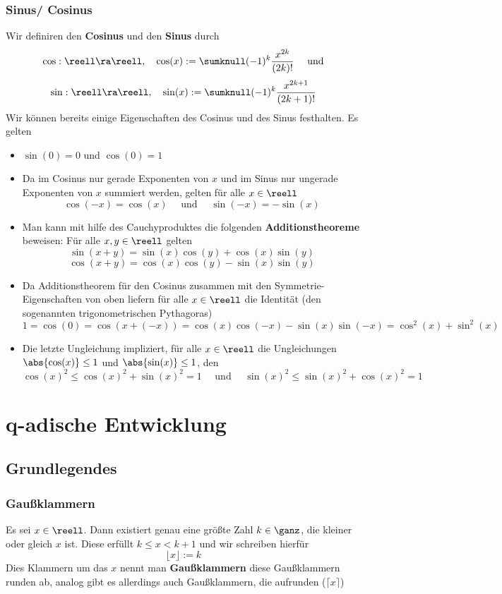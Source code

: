 \documentclass{kit}
\begin{document}
    \subsubsection{Sinus/ Cosinus}
      Wir definiren den \textbf{Cosinus} und den \textbf{Sinus} durch
      $$\cos:\reell\ra\reell,\quad\cos(x):=\sumknull(-1)^k\frac{x^{2k}}{(2k)!}\quad\text{ und}$$
      $$\sin:\reell\ra\reell,\quad\sin(x):=\sumknull(-1)^k\frac{x^{2k+1}}{(2k+1)!}$$
      Wir können bereits einige Eigenschaften des Cosinus und des Sinus festhalten. Es gelten
      \begin{itemize}
        \item $\sin(0)=0$ und $\cos(0)=1$
        \item Da im Cosinus nur gerade Exponenten von $x$ und im Sinus nur ungerade Exponenten von $x$ summiert werden, gelten für alle $x\in\reell$
          $$\cos(-x)=\cos(x)\quad\text{ und }\quad\sin(-x)=-\sin(x)$$
        \item Man kann mit hilfe des Cauchyproduktes die folgenden \textbf{Additionstheoreme} beweisen: Für alle $x,y\in\reell$ gelten
          $$\sin(x+y)=\sin(x)\cos(y)+\cos(x)\sin(y)$$
          $$\cos(x+y)=\cos(x)\cos(y)-\sin(x)\sin(y)$$
        \item Da Additionstheorem für den Cosinus zusammen mit den Symmetrie-Eigenschaften von oben liefern für alle $x\in\reell$ die Identität (den sogenannten trigonometrischen Pythagoras)
          $$1=\cos(0)=\cos(x+(-x))=\cos(x)\cos(-x)-\sin(x)\sin(-x)=\cos^2(x)+\sin^2(x)$$
        \item Die letzte Ungleichung impliziert, für alle $x\in\reell$ die Ungleichungen $\abs{\cos(x)}\le1$ und $\abs{\sin(x)}\le1$, den
          $$\cos(x)^2\le\cos(x)^2+\sin(x)^2=1\quad\text{ und }\quad\sin(x)^2\le\sin(x)^2+\cos(x)^2=1$$
      \end{itemize}
\section{q-adische Entwicklung}
  \subsection{Grundlegendes}
    \subsubsection{Gaußklammern}
      Es sei $x\in\reell$. Dann existiert genau eine größte Zahl $k\in\ganz$, die kleiner oder gleich $x$ ist. Diese erfüllt $k\le x<k+1$ und wir schreiben hierfür
      $$\lfloor x\rfloor:=k$$
      Dies Klammern um das $x$ nennt man \textbf{Gaußklammern} diese Gaußklammern runden ab, analog gibt es allerdings auch Gaußklammern, die aufrunden ($\lceil x\rceil$)
\end{document}

